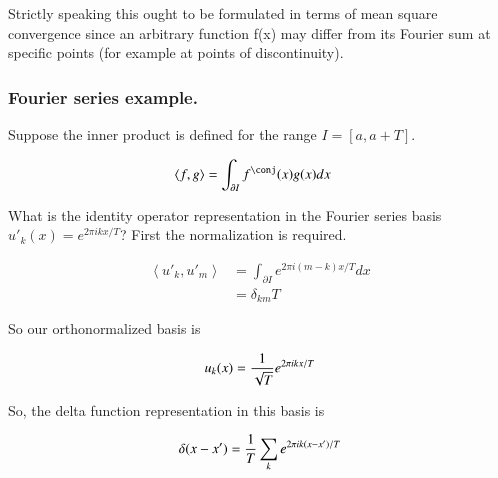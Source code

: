\documentclass{article}
\newcommand{\Innerprod}[2]{\left\langle{#1}, {#2}\right\rangle}
\begin{document}
Strictly speaking this ought to be formulated in terms of mean square convergence since an arbitrary function f(x) 
may differ from its Fourier sum at specific points (for example at points of discontinuity).

\subsubsection{ Fourier series example. }

Suppose the inner product is defined for the range $I = [a, a+T]$.

\begin{align*}
\Innerprod{f}{g} &= \int_{\partial I} f^\conj(x) g(x) dx
\end{align*}

What is the identity operator representation in the Fourier series basis ${u'}_k(x) = e^{ 2 \pi i k x / T}$?  First the 
normalization is required.

\begin{align*}
\Innerprod{{u'}_k}{{u'}_m} 
&= \int_{\partial I} e^{ 2 \pi i (m-k) x /T } dx  \\
&= \delta_{km} T
\end{align*}

So our orthonormalized basis is

\begin{align*}
u_k(x) = \frac{1}{\sqrt{T}} e^{ 2 \pi i k x / T}
\end{align*}

So, the delta function representation in this basis is

\begin{align*}
\delta(x- x') = \frac{1}{{T}} \sum_k e^{ 2 \pi i k (x-x') / T}
\end{align*}







\end{document}
